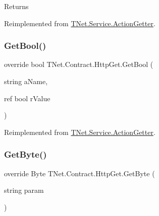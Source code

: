 \begin{DoxyReturn}{Returns}

\end{DoxyReturn}


Reimplemented from \mbox{\hyperlink{class_t_net_1_1_service_1_1_action_getter_a174e4f8b5f3ca0b236c3984e83276f83}{T\+Net.\+Service.\+Action\+Getter}}.

\mbox{\label{class_t_net_1_1_contract_1_1_http_get_a29c9882dfcb0ba5594dca751ae45efb0}} 
\subsubsection{\texorpdfstring{Get\+Bool()}{GetBool()}}
{\footnotesize\ttfamily override bool T\+Net.\+Contract.\+Http\+Get.\+Get\+Bool (\begin{DoxyParamCaption}\item[{string}]{a\+Name,  }\item[{ref bool}]{r\+Value }\end{DoxyParamCaption})\hspace{0.3cm}{\ttfamily [virtual]}}







Reimplemented from \mbox{\hyperlink{class_t_net_1_1_service_1_1_action_getter_aff9d7973b2f74986eeec110c5b2a273f}{T\+Net.\+Service.\+Action\+Getter}}.

\mbox{\label{class_t_net_1_1_contract_1_1_http_get_a26fb9f08e77c8a3d8f085db2b8444e8e}} 
\subsubsection{\texorpdfstring{Get\+Byte()}{GetByte()}\hspace{0.1cm}{\footnotesize\ttfamily [1/3]}}
{\footnotesize\ttfamily override Byte T\+Net.\+Contract.\+Http\+Get.\+Get\+Byte (\begin{DoxyParamCaption}\item[{string}]{param }\end{DoxyParamCaption})\hspace{0.3cm}{\ttfamily [virtual]}}






